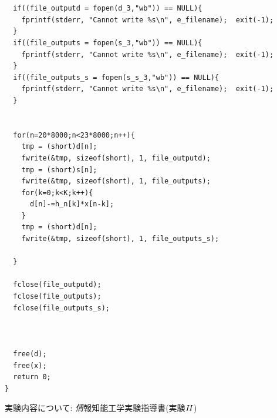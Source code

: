 \documentclass[a4j,12]{jarticle}
\begin{document}
\begin{lstlisting}[caption=課題3で使用するプログラム,label=rp3]
  

  if((file_outputd = fopen(d_3,"wb")) == NULL){
    fprintf(stderr, "Cannot write %s\n", e_filename);  exit(-1);
  }
  if((file_outputs = fopen(s_3,"wb")) == NULL){
    fprintf(stderr, "Cannot write %s\n", e_filename);  exit(-1);
  }
  if((file_outputs_s = fopen(s_s_3,"wb")) == NULL){
    fprintf(stderr, "Cannot write %s\n", e_filename);  exit(-1);
  }


  for(n=20*8000;n<23*8000;n++){
    tmp = (short)d[n];
    fwrite(&tmp, sizeof(short), 1, file_outputd);
    tmp = (short)s[n];
    fwrite(&tmp, sizeof(short), 1, file_outputs);
    for(k=0;k<K;k++){
      d[n]-=h_n[k]*x[n-k];
    }
    tmp = (short)d[n];
    fwrite(&tmp, sizeof(short), 1, file_outputs_s);
  
  }

  fclose(file_outputd);
  fclose(file_outputs);
  fclose(file_outputs_s);


 
  free(d);
  free(x);
  return 0;
}

       \end{lstlisting}

       \begin{thebibliography}{9}
       実験内容について: \textit 情報知能工学実験指導書(実験$I\hspace{-1pt}I$)
       \end{thebibliography}
\end{document}
